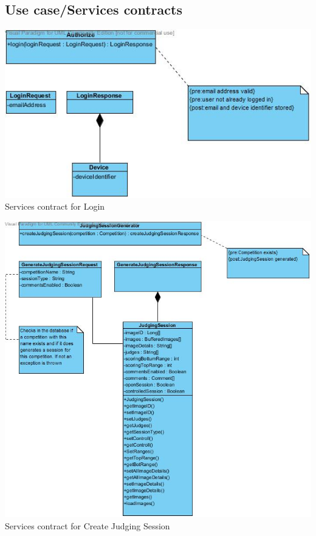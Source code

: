 \documentclass[10pt,a4paper]{article}
\begin{document}

\subsection{Use case/Services contracts}
\begin{center}
\advance\leftskip-1.3cm
\includegraphics[width=160mm]{Pictures/servicesContractLogin.jpg} 
Services contract for Login
\end{center}

\begin{center}
\advance\leftskip-1.3cm
\includegraphics[width=160mm]{Pictures/servicesContractCreateJudgingSession.jpg} 
Services contract for Create Judging Session
\end{center}
\end{document}
